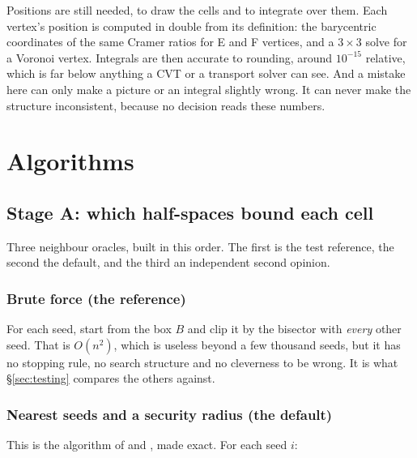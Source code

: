 \documentclass[11pt,a4paper]{article}
\newcommand{\secref}[1]{\S\ref{#1}}
\begin{document}
Positions are still needed, to draw the cells and to integrate over them. Each vertex's position
is computed in double from its definition: the barycentric coordinates of the same Cramer
ratios for E and F vertices, and a $3\times 3$ solve for a Voronoi vertex. Integrals are then
accurate to rounding, around $10^{-15}$ relative, which is far below anything a CVT or a
transport solver can see. And a mistake here can only make a picture or an integral slightly
wrong. It can never make the structure inconsistent, because no decision reads these numbers.

\section{Algorithms}\label{sec:algorithms}

\subsection{Stage A: which half-spaces bound each cell}\label{ssec:stageA}

Three neighbour oracles, built in this order. The first is the test reference, the second the
default, and the third an independent second opinion.

\subsubsection{Brute force (the reference)}\label{sssec:brute}

For each seed, start from the box $B$ and clip it by the bisector with \emph{every} other seed.
That is $O(n^2)$, which is useless beyond a few thousand seeds, but it has no stopping rule, no
search structure and no cleverness to be wrong. It is what \secref{sec:testing} compares the
others against.

\subsubsection{Nearest seeds and a security radius (the default)}\label{sssec:meshless}

This is the algorithm of \citet{levy2012} and \citet{ray2018}, made exact. For each seed $i$:
\end{document}
